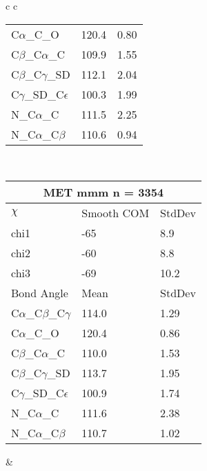 \begin{longtable}{ c c }
\begin{tabular}{ l l l }
  C$\alpha$\_C\_O & 120.4 & 0.80\\
  C$\beta$\_C$\alpha$\_C & 109.9 & 1.55\\
  C$\beta$\_C$\gamma$\_SD & 112.1 & 2.04\\
  C$\gamma$\_SD\_C$\epsilon$ & 100.3 & 1.99\\
  N\_C$\alpha$\_C & 111.5 & 2.25\\
  N\_C$\alpha$\_C$\beta$ & 110.6 & 0.94\\
  \bottomrule
  \end{tabular}
  \\
  \begin{tabular}{ l l l }
  \toprule
  \multicolumn{3}{c}{MET \textbf{mmm} n = 3354} \\ \toprule
  $\chi$       & Smooth COM & StdDev \\ \midrule
  chi1 & -65 & 8.9 \\ 
  chi2 & -60 & 8.8 \\ 
  chi3 & -69 & 10.2 \\ \midrule
  Bond Angle   & Mean     & StdDev \\ \midrule
  C$\alpha$\_C$\beta$\_C$\gamma$ & 114.0 & 1.29\\
  C$\alpha$\_C\_O & 120.4 & 0.86\\
  C$\beta$\_C$\alpha$\_C & 110.0 & 1.53\\
  C$\beta$\_C$\gamma$\_SD & 113.7 & 1.95\\
  C$\gamma$\_SD\_C$\epsilon$ & 100.9 & 1.74\\
  N\_C$\alpha$\_C & 111.6 & 2.38\\
  N\_C$\alpha$\_C$\beta$ & 110.7 & 1.02\\
  \bottomrule
  \end{tabular}
  &
  \\
  
\end{longtable}

\newpage

